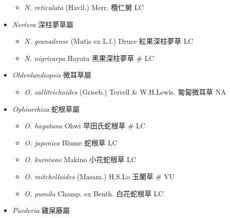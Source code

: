 \begin{itemize}
  \begin{itemize}
        \item[] \textit{N. reticulata} (Havil.) Merr.  欖仁舅   LC
  \end{itemize}
 \item[] \textit{Nertera} 深柱夢草屬
                                
  \begin{itemize}
        \item[] \textit{N. granadense} (Mutis ex L.f.) Druce  紅果深柱夢草   LC
        \item[] \textit{N. nigricarpa} Hayata  黑果深柱夢草  \# LC
  \end{itemize}
 \item[] \textit{Oldenlandiopsis} 微耳草屬 
                                
  \begin{itemize}
        \item[] \textit{O. callitrichoides} (Griseb.) Terrell \& W.H.Lewis.  匍匐微耳草   NA
  \end{itemize}
 \item[] \textit{Ophiorrhiza} 蛇根草屬
                                
  \begin{itemize}
        \item[] \textit{O. hayatana} Ohwi  早田氏蛇根草  \# LC
        \item[] \textit{O. japonica} Blume  蛇根草   LC
        \item[] \textit{O. kuroiwae} Makino  小花蛇根草   LC
        \item[] \textit{O. mitchelloides} (Masam.) H.S.Lo  玉蘭草  \# VU
        \item[] \textit{O. pumila} Champ. ex Benth.  白花蛇根草   LC
  \end{itemize}
 \item[] \textit{Paederia} 雞屎藤屬
                                

\end{itemize}
